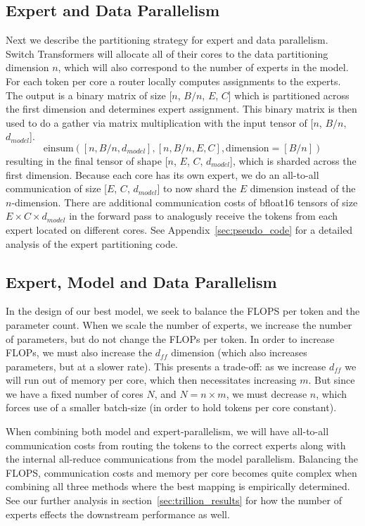 \documentclass[twoside,11pt]{article}
\begin{document}
\subsection{Expert and Data Parallelism} \label{sec: expert_data_parallelism}
Next we describe the partitioning strategy for expert and data parallelism.
Switch Transformers will allocate all of their cores to the data partitioning dimension $n$, which will also correspond to the number of experts in the model.
For each token per core a router locally computes assignments to the experts.
The output is a binary matrix of size [$n$, $B / n$, $E$, $C$] which is partitioned across the first dimension and determines expert assignment.
This binary matrix is then used to do a gather via matrix multiplication with the input tensor of [$n$, $B / n$, $d_{model}$].
\begin{equation}
    \text{einsum}([n, B / n, d_{model}], [n, B / n, E, C], \text{dimension}=[B / n])
\end{equation}
resulting in the final tensor of shape [$n$, $E$, $C$, $d_{model}$], which is sharded across the first dimension.
Because each core has its own expert, we do an all-to-all communication of size [$E$, $C$, $d_{model}$] to now shard the $E$ dimension instead of the $n$-dimension.
There are additional communication costs of bfloat16 tensors of size $E \times C \times d_{model}$ in the forward pass to analogusly receive the tokens from each expert located on different cores.
See Appendix~\ref{sec:pseudo_code} for a detailed analysis of the expert partitioning code.

\subsection{Expert, Model and Data Parallelism}
\label{sec: expert_model_data_par}
In the design of our best model, we seek to balance the FLOPS per token and the parameter count.
When we scale the number of experts, we increase the number of parameters, but do not change the FLOPs per token.
In order to increase FLOPs, we must also increase the $d_{ff}$ dimension (which also increases parameters, but at a slower rate).
This presents a trade-off: as we increase $d_{ff}$ we will run out of memory per core, which then necessitates increasing $m$. 
But since we have a fixed number of cores $N$, and $N=n \times m$, we must decrease $n$, which forces use of a smaller batch-size (in order to hold tokens per core constant).

When combining both model and expert-parallelism, we will have all-to-all communication costs from routing the tokens to the correct experts along with the internal all-reduce communications from the model parallelism. 
Balancing the FLOPS, communication costs and memory per core becomes quite complex when combining all three methods where the best mapping is empirically determined.
See our further analysis in section~\ref{sec:trillion_results} for how the number of experts effects the downstream performance as well. 
\end{document}
